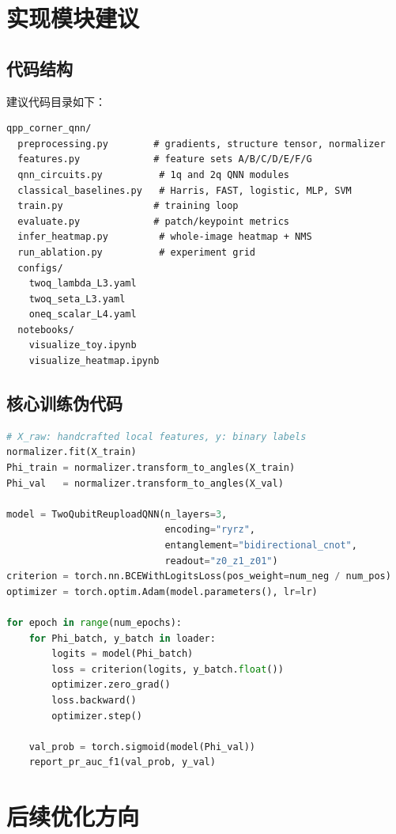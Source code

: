 \documentclass[UTF8,zihao=-4]{ctexart}
\begin{document}
\section{实现模块建议}

\subsection{代码结构}

建议代码目录如下：
\begin{lstlisting}
qpp_corner_qnn/
  preprocessing.py        # gradients, structure tensor, normalizer
  features.py             # feature sets A/B/C/D/E/F/G
  qnn_circuits.py          # 1q and 2q QNN modules
  classical_baselines.py   # Harris, FAST, logistic, MLP, SVM
  train.py                # training loop
  evaluate.py             # patch/keypoint metrics
  infer_heatmap.py         # whole-image heatmap + NMS
  run_ablation.py          # experiment grid
  configs/
    twoq_lambda_L3.yaml
    twoq_seta_L3.yaml
    oneq_scalar_L4.yaml
  notebooks/
    visualize_toy.ipynb
    visualize_heatmap.ipynb
\end{lstlisting}

\subsection{核心训练伪代码}

\begin{lstlisting}[language=Python]
# X_raw: handcrafted local features, y: binary labels
normalizer.fit(X_train)
Phi_train = normalizer.transform_to_angles(X_train)
Phi_val   = normalizer.transform_to_angles(X_val)

model = TwoQubitReuploadQNN(n_layers=3,
                            encoding="ryrz",
                            entanglement="bidirectional_cnot",
                            readout="z0_z1_z01")
criterion = torch.nn.BCEWithLogitsLoss(pos_weight=num_neg / num_pos)
optimizer = torch.optim.Adam(model.parameters(), lr=lr)

for epoch in range(num_epochs):
    for Phi_batch, y_batch in loader:
        logits = model(Phi_batch)
        loss = criterion(logits, y_batch.float())
        optimizer.zero_grad()
        loss.backward()
        optimizer.step()

    val_prob = torch.sigmoid(model(Phi_val))
    report_pr_auc_f1(val_prob, y_val)
\end{lstlisting}

\section{后续优化方向}
\end{document}
